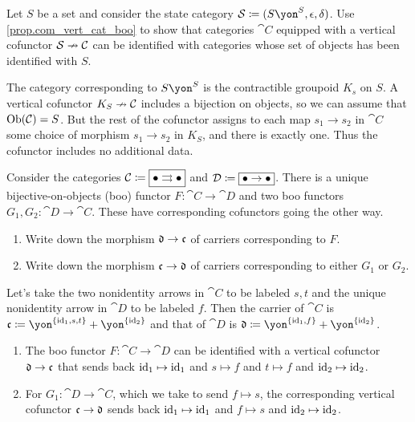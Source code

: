 \documentclass[Book-Poly]{subfiles}
\begin{document}
\begin{exercise}
Let $S$ be a set and consider the state category $\cat{S}\coloneqq(S\yon^S,\epsilon,\delta)$. Use \cref{prop.com_vert_cat_boo} to show that categories $\cat{C}$ equipped with a vertical cofunctor $\mathcal{S}\nrightarrow\mathcal{C}$ can be identified with categories whose set of objects has been identified with $S$.
\begin{solution}
The category corresponding to $S\yon^S$ is the contractible groupoid $K_s$ on $S$. A vertical cofunctor $K_S\nrightarrow\mathcal{C}$ includes a bijection on objects, so we can assume that $\operatorname{Ob}(\mathcal{C})=S$. But the rest of the cofunctor assigns to each map $s_1\to s_2$ in $\cat{C}$ some choice of morphism $s_1\to s_2$ in $K_S$, and there is exactly one. Thus the cofunctor includes no additional data.
\end{solution}
\end{exercise}

\begin{exercise}
Consider the categories $\mathcal{C}\coloneqq\fbox{$\bullet\rightrightarrows\bullet$}$ and $\mathcal{D}\coloneqq\fbox{$\bullet\to\bullet$}$. There is a unique bijective-on-objects (boo) functor $F\colon\cat{C}\to\cat{D}$ and two boo functors $G_1,G_2\colon\cat{D}\to\cat{C}$. These have corresponding cofunctors going the other way.
\begin{enumerate}
	\item Write down the morphism $\mathfrak{d}\to\mathfrak{c}$ of carriers corresponding to $F$.
	\item Write down the morphism $\mathfrak{c}\to\mathfrak{d}$ of carriers corresponding to either $G_1$ or $G_2$.
\qedhere
\end{enumerate}
\begin{solution}
Let's take the two nonidentity arrows in $\cat{C}$ to be labeled $s,t$ and the unique nonidentity arrow in $\cat{D}$ to be labeled $f$. Then the carrier of $\cat{C}$ is $\car{c}\coloneqq\yon^{\{\id_1,s,t\}}+\yon^{\{\id_2\}}$ and that of $\cat{D}$ is $\car{d}\coloneqq\yon^{\{\id_1,f\}}+\yon^{\{\id_2\}}$.
\begin{enumerate}
    \item The boo functor $F\colon\cat{C}\to\cat{D}$ can be identified with a vertical cofunctor $\mathfrak{d}\to\mathfrak{c}$ that sends back $\mathrm{id}_1\mapsto\mathrm{id}_1$ and $s\mapsto f$ and $t\mapsto f$ and $\mathrm{id}_2\mapsto\mathrm{id}_2$.
    \item For $G_1\colon\cat{D}\to\cat{C}$, which we take to send $f\mapsto s$, the corresponding vertical cofunctor $\mathfrak{c}\to\mathfrak{d}$ sends back $\mathrm{id}_1\mapsto\mathrm{id}_1$ and $f\mapsto s$ and $\mathrm{id}_2\mapsto\mathrm{id}_2$.
\end{enumerate}
\end{solution}
\end{exercise}
\end{document}
